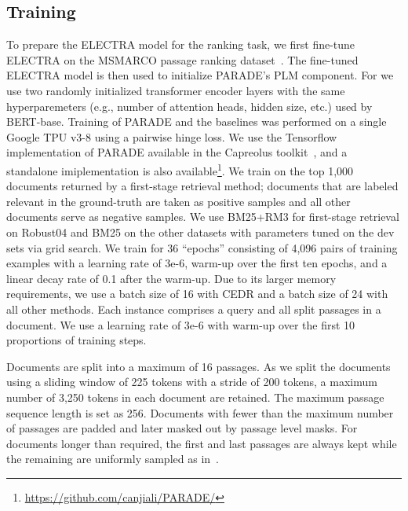 \subsection{Training} \label{sec:training}
To prepare the ELECTRA model for the ranking task, we first fine-tune ELECTRA on the MSMARCO passage ranking dataset~\cite{msmarco}.
The fine-tuned ELECTRA model is then used to initialize PARADE's PLM component.
For  we use two randomly initialized transformer encoder layers with the same hyperparemeters  (e.g., number of attention heads, hidden size, etc.) used by BERT-base.
Training of PARADE and the baselines was performed on a single Google TPU v3-8 using a pairwise hinge loss.
We use the Tensorflow implementation of PARADE available in the Capreolus toolkit~\cite{yates2020capreolus}, and a standalone imiplementation is also available\footnote{\url{https://github.com/canjiali/PARADE/}}.
We train on the top 1,000 documents returned by a first-stage retrieval method; documents that are labeled relevant in the ground-truth are taken as positive samples and all other documents serve as negative samples.
We use BM25+RM3 for first-stage retrieval on Robust04 and BM25 on the other datasets with parameters tuned on the dev sets via grid search.
We train for 36 ``epochs'' consisting of 4,096 pairs of training examples with a learning rate of 3e-6, warm-up over the first ten epochs, and a linear decay rate of 0.1 after the warm-up.
Due to its larger memory requirements, we use a batch size of 16 with CEDR and a batch size of 24 with all other methods.
Each instance comprises a query and all split passages in a document.
We use a learning rate of 3e-6 with warm-up over the first 10 proportions of training steps.


Documents are split into a maximum of 16 passages. 
As we split the documents using a sliding window of 225 tokens with a stride of 200 tokens, a maximum number of 3,250 tokens in each document are retained.
The maximum passage sequence length is set as 256.
Documents with fewer than the maximum number of passages are padded and later masked out by passage level masks.
For documents longer than required, the first and last passages are always kept while the remaining are uniformly sampled as in~\cite{DBLP:conf/sigir/DaiC19}.


